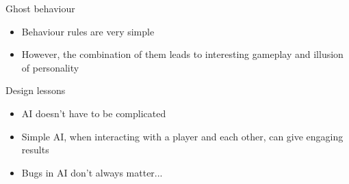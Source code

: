 \begin{frame}{Ghost behaviour}
	\begin{itemize}
		\pause\item Behaviour rules are very simple
		\pause\item However, the combination of them leads to interesting gameplay and illusion of personality
	\end{itemize}
\end{frame}

\begin{frame}{Design lessons}
	\begin{itemize}
		\pause\item AI doesn't have to be complicated
		\pause\item Simple AI, when interacting with a player and each other, can give engaging results
		\pause\item Bugs in AI don't always matter...
	\end{itemize}
\end{frame}

